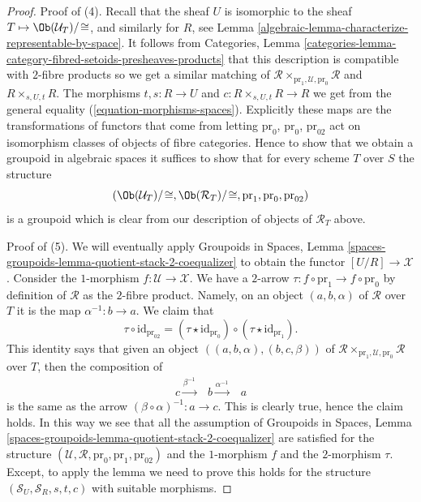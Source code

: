 \begin{proof}
\medskip\noindent
Proof of (4). Recall that the sheaf $U$ is isomorphic to the sheaf
$T \mapsto \Ob(\mathcal{U}_T)/\!\cong$, and
similarly for $R$, see
Lemma \ref{algebraic-lemma-characterize-representable-by-space}.
It follows from
Categories,
Lemma \ref{categories-lemma-category-fibred-setoids-presheaves-products}
that this description is compatible with $2$-fibre products
so we get a similar matching of
$\mathcal{R} \times_{\text{pr}_1, \mathcal{U}, \text{pr}_0} \mathcal{R}$
and $R \times_{s, U, t} R$.
The morphisms $t, s : R \to U$ and $c : R \times_{s, U, t} R \to R$
we get from the general equality (\ref{equation-morphisms-spaces}).
Explicitly these maps are the transformations of functors that come
from letting $\text{pr}_0$, $\text{pr}_0$, $\text{pr}_{02}$
act on isomorphism classes of objects of fibre categories.
Hence to show that we obtain a groupoid in algebraic
spaces it suffices to show that for every scheme $T$ over $S$
the structure
$$
(\Ob(\mathcal{U}_T)/\!\cong,
\Ob(\mathcal{R}_T)/\!\cong,
\text{pr}_1, \text{pr}_0, \text{pr}_{02})
$$
is a groupoid which is clear from our description of objects of
$\mathcal{R}_T$ above.

\medskip\noindent
Proof of (5). We will eventually apply
Groupoids in Spaces,
Lemma \ref{spaces-groupoids-lemma-quotient-stack-2-coequalizer}
to obtain the functor $[U/R] \to \mathcal{X}$.
Consider the $1$-morphism $f : \mathcal{U} \to \mathcal{X}$.
We have a $2$-arrow $\tau : f \circ \text{pr}_1 \to f \circ \text{pr}_0$
by definition of $\mathcal{R}$ as the $2$-fibre product.
Namely, on an object $(a, b, \alpha)$ of $\mathcal{R}$ over $T$ it is
the map $\alpha^{-1} : b \to a$. We claim that
$$
\tau \circ \text{id}_{\text{pr}_{02}} =
(\tau \star \text{id}_{\text{pr}_0})
\circ
(\tau \star \text{id}_{\text{pr}_1}).
$$
This identity says that given an object
$((a, b, \alpha), (b, c, \beta))$ of
$\mathcal{R} \times_{\text{pr}_1, \mathcal{U}, \text{pr}_0} \mathcal{R}$
over $T$, then the composition of
$$
\begin{array}{ccc}c \overset{\beta^{-1}}{\longrightarrow} & b \overset{\alpha^{-1}}{\longrightarrow} & a\end{array}
$$
is the same as the arrow $(\beta \circ \alpha)^{-1} : a \to c$. This is
clearly true, hence the claim holds. In this way we see that all the
assumption of
Groupoids in Spaces,
Lemma \ref{spaces-groupoids-lemma-quotient-stack-2-coequalizer}
are satisfied for the structure
$(\mathcal{U}, \mathcal{R}, \text{pr}_0, \text{pr}_1, \text{pr}_{02})$
and the $1$-morphism $f$ and the $2$-morphism $\tau$.
Except, to apply the lemma we need to prove this holds
for the structure $(\mathcal{S}_U, \mathcal{S}_R, s, t, c)$
with suitable morphisms.


\end{proof}

